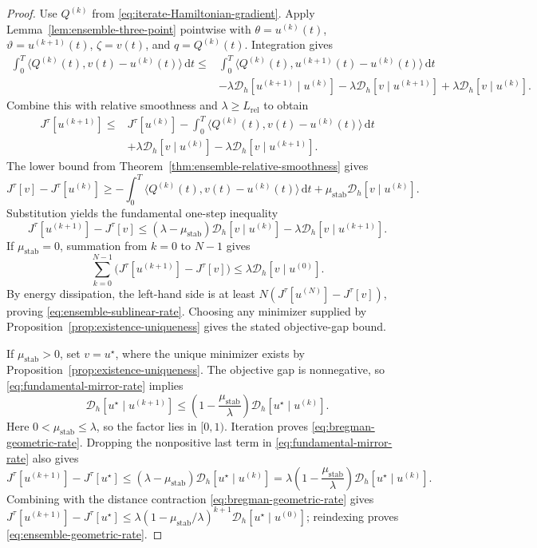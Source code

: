 \documentclass[11pt]{amsart}
\numberwithin{equation}{section} %
\newcommand{\dd}{\mathrm{d}}
\theoremstyle{remark}
\begin{document}
\begin{proof}
Use $Q^{(k)}$ from \eqref{eq:iterate-Hamiltonian-gradient}.
Apply Lemma~\ref{lem:ensemble-three-point} pointwise with
$\theta=u^{(k)}(t)$, $\vartheta=u^{(k+1)}(t)$,
$\zeta=v(t)$, and $q=Q^{(k)}(t)$. Integration gives
\begin{align}
\label{eq:integrated-three-point}
\int_0^T\langle Q^{(k)}(t),v(t)-u^{(k)}(t)\rangle\,\dd t
\le{}&\int_0^T\langle Q^{(k)}(t),u^{(k+1)}(t)-u^{(k)}(t)\rangle\,\dd t\nonumber\\
&-\lambda\mathcal D_h[u^{(k+1)}\mid u^{(k)}]
-\lambda\mathcal D_h[v\mid u^{(k+1)}]
+\lambda\mathcal D_h[v\mid u^{(k)}].
\end{align}
Combine this with relative smoothness and
$\lambda\ge L_{\mathrm{rel}}$ to obtain
\begin{align}
\label{eq:mirror-rate-intermediate}
J^\tau[u^{(k+1)}]\le{}&J^\tau[u^{(k)}]
-\int_0^T\langle Q^{(k)}(t),v(t)-u^{(k)}(t)\rangle\,\dd t\nonumber\\
&+\lambda\mathcal D_h[v\mid u^{(k)}]
-\lambda\mathcal D_h[v\mid u^{(k+1)}].
\end{align}
The lower bound from Theorem~\ref{thm:ensemble-relative-smoothness} gives
\[
J^\tau[v]-J^\tau[u^{(k)}]\ge
-\int_0^T\langle Q^{(k)}(t),v(t)-u^{(k)}(t)\rangle\,\dd t
+\mu_{\mathrm{stab}}\mathcal D_h[v\mid u^{(k)}].
\]
Substitution yields the fundamental one-step inequality
\begin{equation}
\label{eq:fundamental-mirror-rate}
J^\tau[u^{(k+1)}]-J^\tau[v]
\le(\lambda-\mu_{\mathrm{stab}})\mathcal D_h[v\mid u^{(k)}]
-\lambda\mathcal D_h[v\mid u^{(k+1)}].
\end{equation}
If $\mu_{\mathrm{stab}}=0$, summation from $k=0$ to $N-1$ gives
\[
\sum_{k=0}^{N-1}\bigl(J^\tau[u^{(k+1)}]-J^\tau[v]\bigr)
\le\lambda\mathcal D_h[v\mid u^{(0)}].
\]
By energy dissipation, the left-hand side is at least
$N(J^\tau[u^{(N)}]-J^\tau[v])$, proving
\eqref{eq:ensemble-sublinear-rate}. Choosing any minimizer supplied by
Proposition~\ref{prop:existence-uniqueness} gives the stated objective-gap bound.

If $\mu_{\mathrm{stab}}>0$, set $v=u^\star$, where the unique minimizer
exists by Proposition~\ref{prop:existence-uniqueness}. The objective gap is nonnegative,
so \eqref{eq:fundamental-mirror-rate} implies
\[
\mathcal D_h[u^\star\mid u^{(k+1)}]
\le\left(1-\frac{\mu_{\mathrm{stab}}}{\lambda}\right)\mathcal D_h[u^\star\mid u^{(k)}].
\]
Here $0<\mu_{\mathrm{stab}}\le\lambda$, so the
factor lies in $[0,1)$. Iteration proves
\eqref{eq:bregman-geometric-rate}. Dropping the nonpositive last
term in \eqref{eq:fundamental-mirror-rate} also gives
\[
J^\tau[u^{(k+1)}]-J^\tau[u^\star]
\le(\lambda-\mu_{\mathrm{stab}})\mathcal D_h[u^\star\mid u^{(k)}]
{}=\lambda\left(1-\frac{\mu_{\mathrm{stab}}}{\lambda}\right)\mathcal D_h[u^\star\mid u^{(k)}].
\]
Combining with the distance contraction \eqref{eq:bregman-geometric-rate} gives
$J^\tau[u^{(k+1)}]-J^\tau[u^\star]\le\lambda(1-\mu_{\mathrm{stab}}/\lambda)^{k+1}\mathcal D_h[u^\star\mid u^{(0)}]$;
reindexing proves
\eqref{eq:ensemble-geometric-rate}.
\end{proof}
\end{document}
